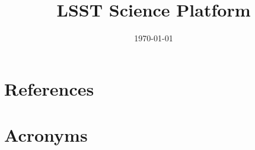 \documentclass[modern]{aastex62}
\begin{document}

\date{\today}
\title{LSST Science Platform}





\appendix

\section{References} \label{sec:bib}



\section{Acronyms} \label{sec:acronyms}

\end{document}
